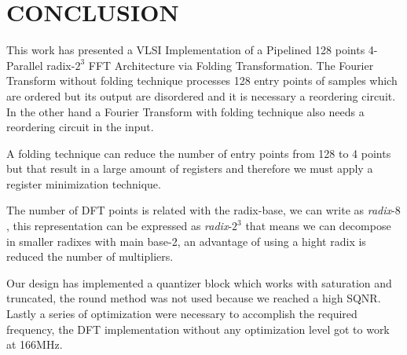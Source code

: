 \documentclass[journal,comsoc]{IEEEtran}
\begin{document}
\section{CONCLUSION}
This work has presented a VLSI Implementation of a Pipelined 128 points 4-Parallel radix-$2^3$ FFT Architecture via Folding Transformation. The Fourier Transform without folding technique processes 128 entry points of samples which are ordered but its output are disordered and it is necessary a reordering circuit. In the other hand a Fourier Transform with folding technique also needs a reordering circuit in the input.

A folding technique can reduce the number of entry points from 128 to 4 points but that result in a large amount of registers and therefore we must apply a register minimization technique. 

The number of DFT points is related with the radix-base, we can write as \textit{radix}-$8$, this representation can be expressed as \textit{radix}-$2^3$ that means we can decompose in smaller radixes with main base-2, an advantage of using a hight radix is reduced the number of multipliers.

Our design has implemented a quantizer block which works with saturation and truncated, the round method was not used because we reached a high SQNR. Lastly a series of optimization were necessary to accomplish the required frequency, the DFT implementation without any optimization level got to work at 166MHz.






\end{document}
